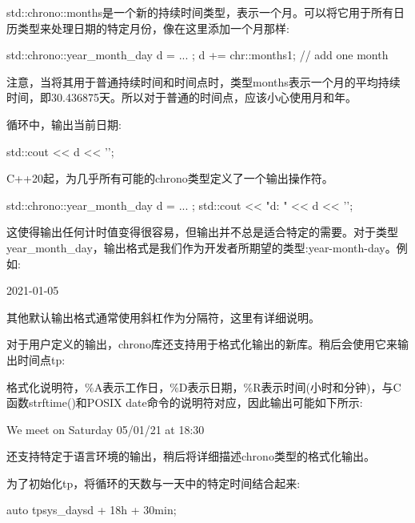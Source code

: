 std::chrono::months是一个新的持续时间类型，表示一个月。可以将它用于所有日历类型来处理日期的特定月份，像在这里添加一个月那样:

\begin{cpp}
std::chrono::year_month_day d = ... ;
d += chr::months{1}; // add one month
\end{cpp}

注意，当将其用于普通持续时间和时间点时，类型months表示一个月的平均持续时间，即30.436875天。所以对于普通的时间点，应该小心使用月和年。


循环中，输出当前日期:

\begin{cpp}
std::cout << d << '\n';
\end{cpp}

C++20起，为几乎所有可能的chrono类型定义了一个输出操作符。

\begin{cpp}
std::chrono::year_month_day d = ... ;
std::cout << "d: " << d << '\n';
\end{cpp}

这使得输出任何计时值变得很容易，但输出并不总是适合特定的需要。对于类型year\_month\_day，输出格式是我们作为开发者所期望的类型:year-month-day。例如:

\begin{shell}
2021-01-05
\end{shell}

其他默认输出格式通常使用斜杠作为分隔符，这里有详细说明。

对于用户定义的输出，chrono库还支持用于格式化输出的新库。稍后会使用它来输出时间点tp:


格式化说明符，\%A表示工作日，\%D表示日期，\%R表示时间(小时和分钟)，与C函数strftime()和POSIX date命令的说明符对应，因此输出可能如下所示:

\begin{shell}
We meet on Saturday 05/01/21 at 18:30
\end{shell}

还支持特定于语言环境的输出，稍后将详细描述chrono类型的格式化输出。


为了初始化tp，将循环的天数与一天中的特定时间结合起来:

\begin{cpp}
auto tp{sys_days{d} + 18h + 30min};
\end{cpp}

